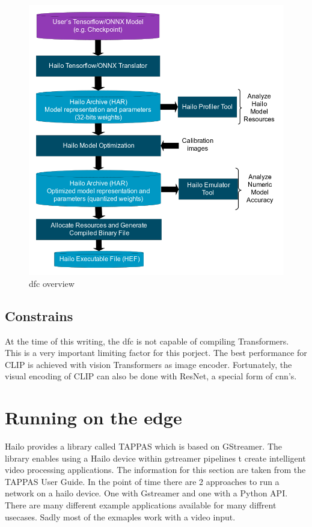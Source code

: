 \begin{figure}
    \centering
    \includegraphics[width=\textwidth]{Images/Hardware/model_build_overview_with_onnx_and_hef_w_har.png}
    \caption{\Acrlong{dfc} overview \cite{hailo_dataflow_compiler}}
    \label{fig:hardware:dfcoverview}
\end{figure}

\subsection{Constrains}
At the time of this writing, the \acrshort{dfc} is not capable of compiling Transformers.
This is a very important limiting factor for this porject.
The best performance for CLIP is achieved with vision Transformers as image encoder.
Fortunately, the visual encoding of CLIP can also be done with ResNet, a special form of \Acrshort{cnn}'s.

\section{Running on the edge}

Hailo provides a library called TAPPAS which is based on GStreamer.
The library enables using a Hailo device within gstreamer pipelines t create intelligent video processing applications.
The information for this section are taken from the TAPPAS User Guide.
In the point of time there are 2 approaches to run a network on a hailo device.
One with Gstreamer and one with a Python API.
There are many different example applications available for many diffrent usecases.
Sadly most of the exmaples work with a video input.


